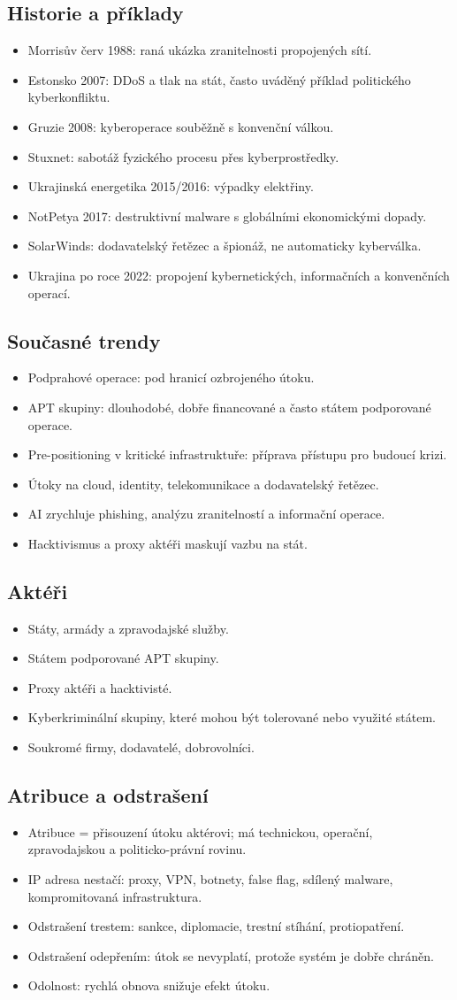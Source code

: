 \documentclass[10pt,a4paper]{article}
\newcommand{\blok}[1]{\subsection*{#1}}
\begin{document}
\blok{Historie a příklady}
\begin{itemize}
  \item Morrisův červ 1988: raná ukázka zranitelnosti propojených sítí.
  \item Estonsko 2007: DDoS a tlak na stát, často uváděný příklad politického kyberkonfliktu.
  \item Gruzie 2008: kyberoperace souběžně s konvenční válkou.
  \item Stuxnet: sabotáž fyzického procesu přes kyberprostředky.
  \item Ukrajinská energetika 2015/2016: výpadky elektřiny.
  \item NotPetya 2017: destruktivní malware s globálními ekonomickými dopady.
  \item SolarWinds: dodavatelský řetězec a špionáž, ne automaticky kyberválka.
  \item Ukrajina po roce 2022: propojení kybernetických, informačních a konvenčních operací.
\end{itemize}

\blok{Současné trendy}
\begin{itemize}
  \item Podprahové operace: pod hranicí ozbrojeného útoku.
  \item APT skupiny: dlouhodobé, dobře financované a často státem podporované operace.
  \item Pre-positioning v kritické infrastruktuře: příprava přístupu pro budoucí krizi.
  \item Útoky na cloud, identity, telekomunikace a dodavatelský řetězec.
  \item AI zrychluje phishing, analýzu zranitelností a informační operace.
  \item Hacktivismus a proxy aktéři maskují vazbu na stát.
\end{itemize}

\blok{Aktéři}
\begin{itemize}
  \item Státy, armády a zpravodajské služby.
  \item Státem podporované APT skupiny.
  \item Proxy aktéři a hacktivisté.
  \item Kyberkriminální skupiny, které mohou být tolerované nebo využité státem.
  \item Soukromé firmy, dodavatelé, dobrovolníci.
\end{itemize}

\blok{Atribuce a odstrašení}
\begin{itemize}
  \item Atribuce = přisouzení útoku aktérovi; má technickou, operační, zpravodajskou a politicko-právní rovinu.
  \item IP adresa nestačí: proxy, VPN, botnety, false flag, sdílený malware, kompromitovaná infrastruktura.
  \item Odstrašení trestem: sankce, diplomacie, trestní stíhání, protiopatření.
  \item Odstrašení odepřením: útok se nevyplatí, protože systém je dobře chráněn.
  \item Odolnost: rychlá obnova snižuje efekt útoku.
\end{itemize}
\end{document}
